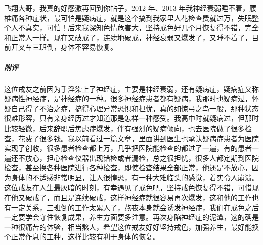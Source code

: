 \begin{case}
    飞翔大哥，我真的好感激再回到你帖子，2012 年、2013 年我神经衰弱睡不着，腰椎痛各种症状，最可怕是疑病症，就是这个搞到我家里人花检查费就过万，失眠整个人不真实，可怕！后来我深知色情危害大，坚持戒色好几个月恢复得不错，完全和正常人一样。现在又破戒了，连续地破戒，神经衰弱又爆发了，又睡不着了，目前开叉车三班倒，身体不容易恢复。
    \subparagraph{附评} 这位戒友之前因为手淫染上了神经症，主要是神经衰弱，还有疑病症，疑病症又称疑病性神经症，是神经症的一种。很多神经症患者都有疑病，我那时也疑病过，怀疑自己得了不治之症，搞得心理异常恐惧和担忧，真的如惊弓之鸟一般，那种状态很难形容，只有亲身经历过才知道那是怎样一种感受。我高中时就疑病过，但那时比较轻微，后来辞职后焦虑症爆发，伴有强烈的疑病倾向，也去医院做了很多检查，花费了很多钱。我以前看过一篇文章，里面讲到医生也承认疑病症患者为医院实现了创收，很多患者检查都上万，几乎把医院能检查的都过了一遍，有的患者一遍还不放心，担心检查仪器出现错检或者漏检，总之很担忧，很多人都定期到医院检查，甚至换各种医院进行各种检查，即使检查结果全部正常，他还是不放心，因为身体的不适感非常明显，让人很惶恐，有一种大难临头的感觉，着实令人崩溃。这位戒友在人生最灰暗的时刻，有幸遇见了戒色吧，坚持戒色恢复得不错，可惜现在他又破戒了，而且是连续破戒，这样神经症就很容易再次爆发，这和他的工作也有一定关系，三班倒的工作太累人了，熬夜本身就会诱发神经症，我们在戒色之后一定要学会守住恢复成果，养生方面要多注意。再次身陷神经症的泥潭，这的确是一种很痛苦的体验，相当熬人，希望这位戒友好好坚持戒色，加强养生，最好能换个正常作息的工种，这样比较有利于身体的恢复。
\end{case}

